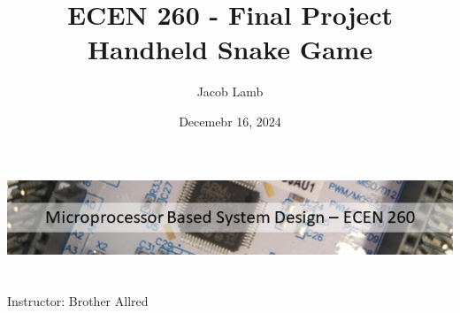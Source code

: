 \title{\large ECEN 260 - Final Project\\[0.5cm]
        \bf\Large Handheld Snake Game}

\author{\large Jacob Lamb}

\date{Decemebr 16, 2024}
\makeatletter
    \begin{titlepage}
        \begin{center}
        \vfill \includegraphics[scale=1]{images/banner}\\[2cm]
        \vbox{}\vspace{1cm}
            {\@title }\\[3cm] 
            {\@author}\\[10cm]

            {Instructor: Brother Allred}\\
            
            {\@date}
        \end{center}
    \end{titlepage}
\makeatother

